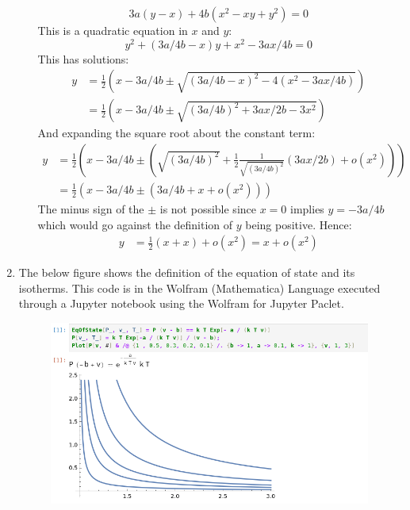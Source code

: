 \documentclass[12pt,a4]{article}
\begin{document}
\begin{enumerate}
\begin{enumerate}
\begin{equation*}
          3 a (y - x) + 4 b (x^2  - xy + y^2) = 0
        \end{equation*}
        This is a quadratic equation in $x$ and $y$:
        \begin{equation*}
          y^2 + (3a/4b - x)y + x^2 - 3a x/4b = 0
        \end{equation*}
        This has solutions:
        \begin{align*}
          y &= \frac{1}{2}\left(x - 3a / 4b \pm \sqrt{(3a/4b - x)^2 - 4 (x^2 - 3a x / 4b)} \right)\\
            &= \frac{1}{2}\left(x - 3a / 4b \pm \sqrt{(3a/4b)^2 + 3a x / 2b - 3x^2} \right)
        \end{align*}
        And expanding the square root about the constant term:
        \begin{align*}
          y &= \frac{1}{2}\left(x - 3a / 4b \pm \left(\sqrt{(3a/4b)^2 } + \frac{1}{2}\frac{1}{\sqrt{(3a/4b)^2 }}( 3a x / 2b ) + o (x^2)\right) \right)\\
            &= \frac{1}{2}\left(x - 3a / 4b \pm \left(3a/4b +  x + o (x^2)\right) \right)
        \end{align*}
        The minus sign of the $\pm$ is not possible since $x = 0$ implies $y = -3a / 4b$ which would go against the definition of $y$ being positive.
        Hence:
        \begin{align*}
          y &= \frac{1}{2}(x + x)  +  o (x^2) = x +  o (x^2)
        \end{align*}
    \end{enumerate}
  \item
    The below figure shows the definition of the equation of state and its isotherms.
    This code is in the Wolfram (Mathematica) Language executed through a Jupyter notebook using the Wolfram for Jupyter Paclet.
    \begin{figure}[H]
      \begin{center}
        \includegraphics[scale = 0.8]{graphsAndDefinitions.png}
      \end{center}
    \end{figure}


\end{enumerate}
\end{document}
